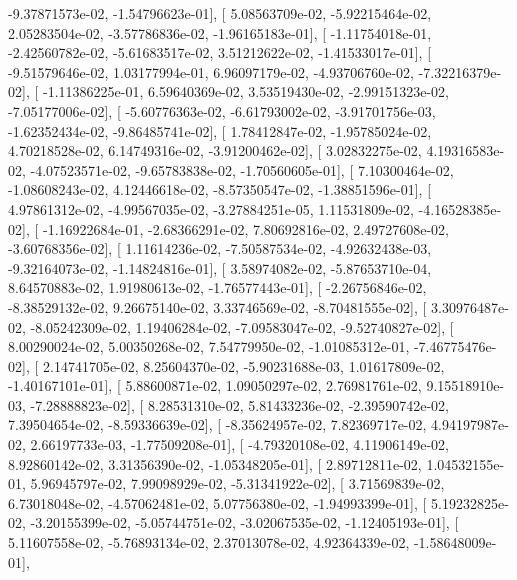 \documentclass{article}
\begin{document}
         -9.37871573e-02,  -1.54796623e-01],
       [  5.08563709e-02,  -5.92215464e-02,   2.05283504e-02,
         -3.57786836e-02,  -1.96165183e-01],
       [ -1.11754018e-01,  -2.42560782e-02,  -5.61683517e-02,
          3.51212622e-02,  -1.41533017e-01],
       [ -9.51579646e-02,   1.03177994e-01,   6.96097179e-02,
         -4.93706760e-02,  -7.32216379e-02],
       [ -1.11386225e-01,   6.59640369e-02,   3.53519430e-02,
         -2.99151323e-02,  -7.05177006e-02],
       [ -5.60776363e-02,  -6.61793002e-02,  -3.91701756e-03,
         -1.62352434e-02,  -9.86485741e-02],
       [  1.78412847e-02,  -1.95785024e-02,   4.70218528e-02,
          6.14749316e-02,  -3.91200462e-02],
       [  3.02832275e-02,   4.19316583e-02,  -4.07523571e-02,
         -9.65783838e-02,  -1.70560605e-01],
       [  7.10300464e-02,  -1.08608243e-02,   4.12446618e-02,
         -8.57350547e-02,  -1.38851596e-01],
       [  4.97861312e-02,  -4.99567035e-02,  -3.27884251e-05,
          1.11531809e-02,  -4.16528385e-02],
       [ -1.16922684e-01,  -2.68366291e-02,   7.80692816e-02,
          2.49727608e-02,  -3.60768356e-02],
       [  1.11614236e-02,  -7.50587534e-02,  -4.92632438e-03,
         -9.32164073e-02,  -1.14824816e-01],
       [  3.58974082e-02,  -5.87653710e-04,   8.64570883e-02,
          1.91980613e-02,  -1.76577443e-01],
       [ -2.26756846e-02,  -8.38529132e-02,   9.26675140e-02,
          3.33746569e-02,  -8.70481555e-02],
       [  3.30976487e-02,  -8.05242309e-02,   1.19406284e-02,
         -7.09583047e-02,  -9.52740827e-02],
       [  8.00290024e-02,   5.00350268e-02,   7.54779950e-02,
         -1.01085312e-01,  -7.46775476e-02],
       [  2.14741705e-02,   8.25604370e-02,  -5.90231688e-03,
          1.01617809e-02,  -1.40167101e-01],
       [  5.88600871e-02,   1.09050297e-02,   2.76981761e-02,
          9.15518910e-03,  -7.28888823e-02],
       [  8.28531310e-02,   5.81433236e-02,  -2.39590742e-02,
          7.39504654e-02,  -8.59336639e-02],
       [ -8.35624957e-02,   7.82369717e-02,   4.94197987e-02,
          2.66197733e-03,  -1.77509208e-01],
       [ -4.79320108e-02,   4.11906149e-02,   8.92860142e-02,
          3.31356390e-02,  -1.05348205e-01],
       [  2.89712811e-02,   1.04532155e-01,   5.96945797e-02,
          7.99098929e-02,  -5.31341922e-02],
       [  3.71569839e-02,   6.73018048e-02,  -4.57062481e-02,
          5.07756380e-02,  -1.94993399e-01],
       [  5.19232825e-02,  -3.20155399e-02,  -5.05744751e-02,
         -3.02067535e-02,  -1.12405193e-01],
       [  5.11607558e-02,  -5.76893134e-02,   2.37013078e-02,
          4.92364339e-02,  -1.58648009e-01],
\end{document}
